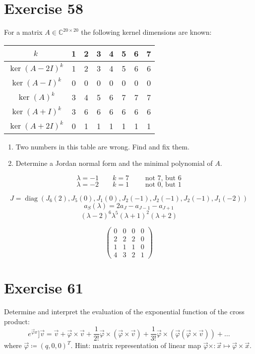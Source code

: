 \documentclass[a4paper]{article}
\theoremstyle{definition}
\begin{document}
\section{Exercise 58}
\begin{ex}
  For a matrix $A \in \mathbb C^{20 \times 20}$ the following kernel dimensions are known:
  \begin{tabular}{c|ccccccc}
    $k$ & 1 & 2 & 3 & 4 & 5 & 6 & 7 \\
  \hline
    $\ker(A - 2I)^k$ & 1 & 2 & 3 & 4 & 5 & 6 & 6 \\
    $\ker(A - I)^k$  & 0 & 0 & 0 & 0 & 0 & 0 & 0 \\
    $\ker(A)^k$      & 3 & 4 & 5 & 6 & 7 & 7 & 7 \\
    $\ker(A + I)^k$  & 3 & 6 & 6 & 6 & 6 & 6 & 6 \\
    $\ker(A + 2I)^k$ & 0 & 1 & 1 & 1 & 1 & 1 & 1
  \end{tabular}
  \begin{enumerate}
    \item Two numbers in this table are wrong. Find and fix them.
    \item Determine a Jordan normal form and the minimal polynomial of $A$.
  \end{enumerate}
\end{ex}

\[ \lambda = -1 \qquad k = 7 \qquad \text{ not 7, but 6} \]
\[ \lambda = -2 \qquad k = 1 \qquad \text{ not 0, but 1} \]

\[ J = \operatorname{diag}(J_6(2), J_5(0), J_1(0), J_2(-1), J_2(-1), J_2(-1), J_1(-2)) \]
\[ a_S(\lambda) = 2a_J - a_{J-1} - a_{J+1} \]
\[ (\lambda - 2)^6 \lambda^5 (\lambda + 1)^2 (\lambda + 2) \]

\[
  \begin{pmatrix}
    0 & 0 & 0 & 0 \\
    2 & 2 & 2 & 0 \\
    1 & 1 & 1 & 0 \\
    4 & 3 & 2 & 1
  \end{pmatrix}
\]

\section{Exercise 61}
\begin{ex}
  Determine and interpret the evaluation of the exponential function of the cross product:
  \[ e^{\vec \varphi x}] \vec v = \vec v + \vec \varphi \times \vec v + \frac1{2!} \vec\varphi \times (\vec \varphi \times \vec v) + \frac1{3!} \vec\varphi \times (\vec \varphi (\vec \varphi \times \vec v)) + \dots \]
  where $\vec\varphi \coloneqq (q, 0, 0)^T$. Hint: matrix representation of linear map $\vec\varphi \times: \vec x \mapsto \vec \varphi \times \vec x$.
\end{ex}
\end{document}
